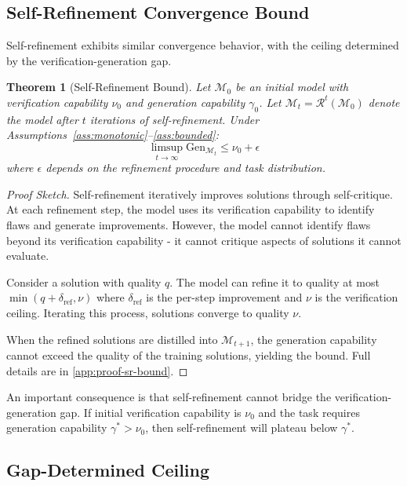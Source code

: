 \documentclass{article}
\newtheorem{theorem}{Theorem}
\theoremstyle{definition}
\theoremstyle{remark}
\newcommand{\M}{\mathcal{M}}  %
\newcommand{\Gen}{\text{Gen}}  %
\begin{document}
\subsection{Self-Refinement Convergence Bound}

Self-refinement exhibits similar convergence behavior, with the ceiling determined by the verification-generation gap.

\begin{theorem}[Self-Refinement Bound]
\label{thm:self-refinement-bound}
Let \(\M_0\) be an initial model with verification capability \(\nu_0\) and generation capability \(\gamma_0\). Let \(\M_t = \mathcal{R}^t(\M_0)\) denote the model after \(t\) iterations of self-refinement. Under Assumptions~\ref{ass:monotonic}--\ref{ass:bounded}:
\[
\limsup_{t \to \infty} \Gen_{\M_t} \leq \nu_0 + \epsilon
\]
where \(\epsilon\) depends on the refinement procedure and task distribution.
\end{theorem}

\begin{proof}[Proof Sketch]
Self-refinement iteratively improves solutions through self-critique. At each refinement step, the model uses its verification capability to identify flaws and generate improvements. However, the model cannot identify flaws beyond its verification capability - it cannot critique aspects of solutions it cannot evaluate.

Consider a solution with quality \(q\). The model can refine it to quality at most \(\min(q + \delta_{\text{ref}}, \nu)\) where \(\delta_{\text{ref}}\) is the per-step improvement and \(\nu\) is the verification ceiling. Iterating this process, solutions converge to quality \(\nu\).

When the refined solutions are distilled into \(\M_{t+1}\), the generation capability cannot exceed the quality of the training solutions, yielding the bound. Full details are in \cref{app:proof-sr-bound}.
\end{proof}

An important consequence is that self-refinement cannot bridge the verification-generation gap. If initial verification capability is \(\nu_0\) and the task requires generation capability \(\gamma^* > \nu_0\), then self-refinement will plateau below \(\gamma^*\).

\subsection{Gap-Determined Ceiling}
\end{document}
